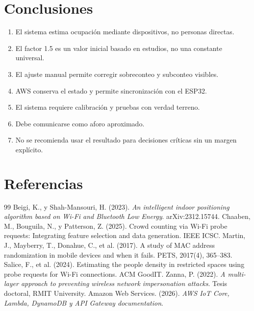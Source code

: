\documentclass[12pt,a4paper]{article}
\begin{document}
\section{Conclusiones}
\begin{enumerate}
\item El sistema estima ocupación mediante dispositivos, no personas directas.
\item El factor 1.5 es un valor inicial basado en estudios, no una constante universal.
\item El ajuste manual permite corregir sobreconteo y subconteo visibles.
\item AWS conserva el estado y permite sincronización con el ESP32.
\item El sistema requiere calibración y pruebas con verdad terreno.
\item Debe comunicarse como aforo aproximado.
\item No se recomienda usar el resultado para decisiones críticas sin un margen explícito.
\end{enumerate}

\section*{Referencias}
\begin{thebibliography}{99}
 Beigi, K., y Shah-Mansouri, H. (2023). \emph{An intelligent indoor positioning algorithm based on Wi-Fi and Bluetooth Low Energy}. arXiv:2312.15744.
 Chaaben, M., Bouguila, N., y Patterson, Z. (2025). Crowd counting via Wi-Fi probe requests: Integrating feature selection and data generation. IEEE ICSC.
 Martin, J., Mayberry, T., Donahue, C., et al. (2017). A study of MAC address randomization in mobile devices and when it fails. PETS, 2017(4), 365--383.
 Salice, F., et al. (2024). Estimating the people density in restricted spaces using probe requests for Wi-Fi connections. ACM GoodIT.
 Zanna, P. (2022). \emph{A multi-layer approach to preventing wireless network impersonation attacks}. Tesis doctoral, RMIT University.
 Amazon Web Services. (2026). \emph{AWS IoT Core, Lambda, DynamoDB y API Gateway documentation}.
\end{thebibliography}
\end{document}
